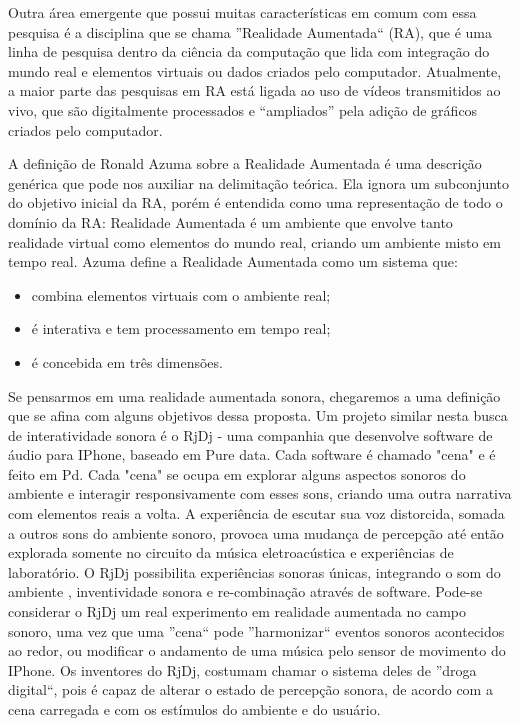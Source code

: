 \documentclass[draft]{ppgmus}
\begin{document}

Outra área emergente que possui muitas características em comum com essa
pesquisa é a disciplina que se chama ''Realidade Aumentada`` (RA), que é uma linha de pesquisa dentro da ciência da computação que lida com 
integração do mundo real e elementos virtuais ou dados criados pelo computador. Atualmente, a 
maior parte das pesquisas em RA está ligada ao uso de vídeos transmitidos ao vivo, que são 
digitalmente processados e “ampliados” pela adição de gráficos criados pelo computador.

A definição de Ronald Azuma 
sobre a Realidade Aumentada \cite{azuma97:ar} é uma descrição genérica que pode nos auxiliar na delimitação teórica. 
Ela ignora um subconjunto do objetivo inicial da RA, porém é entendida como uma representação 
de todo o domínio da RA: Realidade Aumentada é um ambiente que envolve tanto realidade virtual 
como elementos do mundo real, criando um ambiente misto em tempo real.
Azuma define a Realidade Aumentada como um sistema que:
\begin{itemize}
 \item combina elementos virtuais com o ambiente real; 
  \item é interativa e tem processamento em tempo real; 
  \item  é concebida em três dimensões.
\end{itemize}

    
Se pensarmos em uma realidade aumentada sonora, chegaremos a uma definição que se afina 
com alguns objetivos dessa proposta.
Um projeto similar nesta busca de interatividade sonora é o RjDj - uma companhia que desenvolve 
software de áudio para IPhone, baseado em Pure data. Cada software 
é chamado "cena" e é feito em Pd. Cada "cena" se ocupa em explorar alguns 
aspectos sonoros do ambiente e interagir responsivamente com esses sons, criando uma 
outra narrativa com elementos reais a volta. A experiência de escutar sua voz distorcida,
somada a outros sons do ambiente sonoro, provoca uma mudança de percepção até então 
explorada somente no circuito da música eletroacústica e experiências de laboratório. 
O RjDj possibilita experiências sonoras únicas, integrando o som do ambiente , 
inventividade sonora e re-combinação através de software. Pode-se considerar o 
RjDj um real experimento em realidade aumentada no campo sonoro, uma vez que uma ''cena``
pode ''harmonizar`` eventos sonoros acontecidos ao redor, ou modificar o andamento de
uma música pelo sensor de movimento do IPhone. Os inventores do RjDj, costumam chamar 
o sistema deles de ''droga digital``, pois é capaz de alterar o estado de percepção sonora,
de acordo com a cena carregada e com os estímulos do ambiente e do usuário. 
\end{document}
